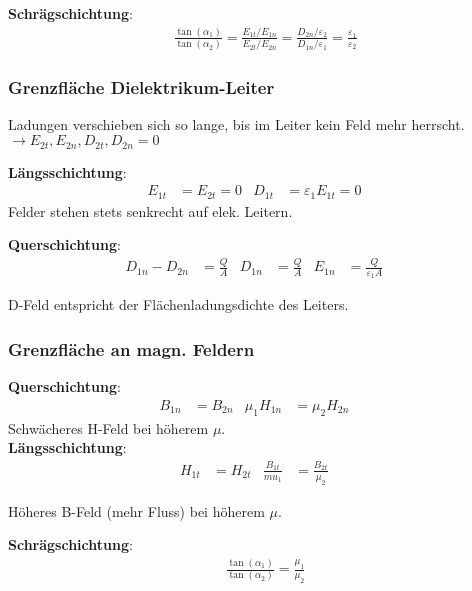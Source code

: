 \vspace{0.5em}
\textbf{Schrägschichtung}:
\begin{align*}
	 & \frac{\tan( \alpha_1)}{\tan( \alpha_2)} = \frac{E_{1t}/E_{1n}}{E_{2t}/E_{2n}} = \frac{D_{2n}/\varepsilon_2}{D_{1n}/\varepsilon_1} = \frac{ \varepsilon_1}{\varepsilon_2}
\end{align*}

\subsubsection{Grenzfläche Dielektrikum-Leiter}
Ladungen verschieben sich so lange, bis im Leiter kein Feld mehr herrscht.
$\rightarrow E_{2t}, E_{2n}, D_{2t}, D_{2n} = 0 $

\vspace{0.5em}
\textbf{Längsschichtung}:
\begin{align*}
	E_{1t} & = E_{2t} = 0 & D_{1t} & =\varepsilon_1 E_{1t} = 0 &
\end{align*}
Felder stehen stets senkrecht auf elek. Leitern.

\vspace{0.5em}
\textbf{Querschichtung}:
\begin{align*}
	D_{1n} - D_{2n} & = \frac{Q}{A} & D_{1n} & = \frac{Q}{A} & E_{1n} & = \frac{Q}{\varepsilon_1 A} &
\end{align*}

D-Feld entspricht der Flächenladungsdichte des Leiters.

\subsubsection{Grenzfläche an magn. Feldern}
\textbf{Querschichtung}:
\begin{align*}
	B_{1n} & = B_{2n} & \mu_1 H_{1n} & =\mu_2 H_{2n} &
\end{align*}
Schwächeres H-Feld bei höherem $ \mu $.\\

\textbf{Längsschichtung}:
\begin{align*}
	H_{1t} & = H_{2t} & \frac{B_{1t}}{mu_1} & = \frac{B_{2t}}{\mu_2} &
\end{align*}

Höheres B-Feld (mehr Fluss) bei höherem $ \mu $.

\vspace{0.5em}
\textbf{Schrägschichtung}:
\begin{align*}
	 & \frac{\tan( \alpha_1)}{\tan( \alpha_2)} = \frac{ \mu_1}{\mu_2}
\end{align*}